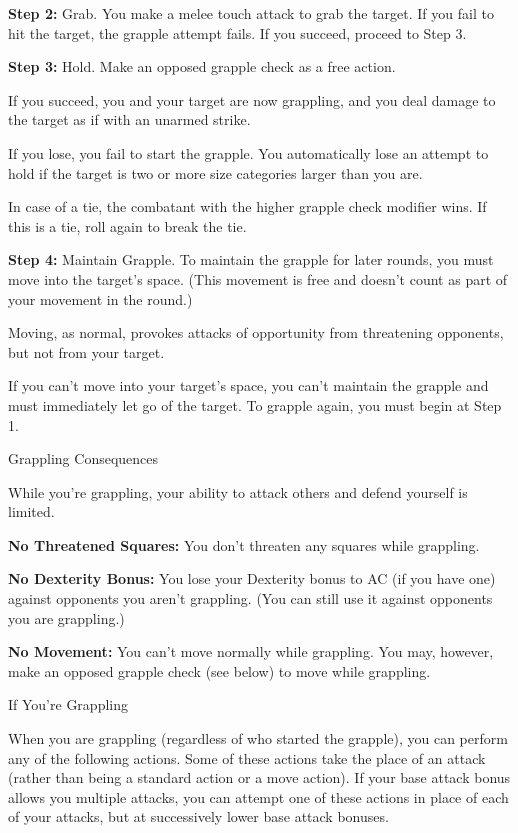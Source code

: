 \documentclass{article}
\begin{document}
\textbf{Step 2:} Grab. You make a melee touch attack to grab the target. If you 
fail to hit the target, the grapple attempt fails. If you succeed, proceed to Step 
3.

\textbf{Step 3:} Hold. Make an opposed grapple check as a free action.

If you succeed, you and your target are now grappling, and you deal damage to the 
target as if with an unarmed strike.

If you lose, you fail to start the grapple. You automatically lose an attempt to 
hold if the target is two or more size categories larger than you are.

In case of a tie, the combatant with the higher grapple check modifier wins. If 
this is a tie, roll again to break the tie.

\textbf{Step 4:} Maintain Grapple. To maintain the grapple for later rounds, you 
must move into the target's space. (This movement is free and doesn't count as 
part of your movement in the round.)

Moving, as normal, provokes attacks of opportunity from threatening opponents, 
but not from your target.

If you can't move into your target's space, you can't maintain the grapple and 
must immediately let go of the target. To grapple again, you must begin at Step 
1.

\vspace{12pt}
Grappling Consequences

While you're grappling, your ability to attack others and defend yourself is limited.

\textbf{No Threatened Squares:} You don't threaten any squares while grappling.

\textbf{No Dexterity Bonus:} You lose your Dexterity bonus to AC (if you have one) 
against opponents you aren't grappling. (You can still use it against opponents 
you are grappling.)

\textbf{No Movement:} You can't move normally while grappling. You may, however, 
make an opposed grapple check (see below) to move while grappling.

\vspace{12pt}
If You're Grappling

When you are grappling (regardless of who started the grapple), you can perform 
any of the following actions. Some of these actions take the place of an attack 
(rather than being a standard action or a move action). If your base attack bonus 
allows you multiple attacks, you can attempt one of these actions in place of each 
of your attacks, but at successively lower base attack bonuses.
\end{document}
